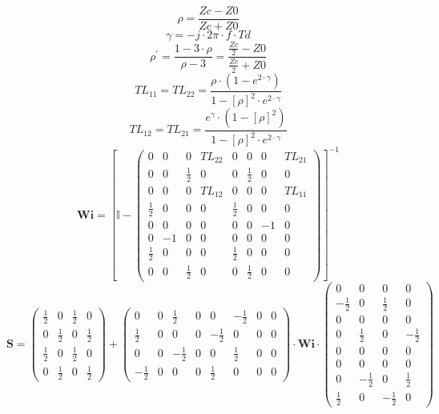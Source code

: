 \[ \rho =  \frac{ Zc-Z0 }{ Zc + Z0 } \]
\[ \gamma =  -j \cdot 2 \pi \cdot f \cdot Td \]
\[ \rho^\prime = \frac{1-3\cdot \rho }{\rho - 3} =  \frac{ \frac{ Zc
}{2} - Z0  }{ \frac{ Zc }{2} + Z0 } \]
\[ TL_{11}=TL_{22} =  \frac{ \rho \cdot \left( 1 - e^{2 \cdot \gamma }
\right) }{ 1 - \left[ \rho \right]^2 \cdot e^{2 \cdot \gamma }  } \]
\[ TL_{12}=TL_{21} =  \frac{ e^{\gamma} \cdot \left( 1 - \left[ \rho
\right] ^2 \right) }{ 1 - \left[ \rho \right]^2 \cdot e^{2 \cdot
\gamma }  }  \]
\[ \mathbf{Wi} =  \left[ \mathbb{I}  - \left(\begin{smallmatrix} 0 & 0
& 0 & TL_{22} & 0 & 0 & 0 & TL_{21} \\ 0 & 0 &  \frac{ 1 }{2}  & 0 & 0
&  \frac{ 1 }{ 2 }  & 0 & 0 \\ 0 & 0 & 0 & TL_{12} & 0 & 0 & 0 &
TL_{11} \\  \frac{ 1 }{ 2 }  & 0 & 0 & 0 &  \frac{ 1 }{2}  & 0 & 0 & 0
\\ 0 & 0 & 0 & 0 & 0 & 0 & -1 & 0 \\ 0 & -1 & 0 & 0 & 0 & 0 & 0 & 0 \\
\frac{ 1 }{2}  & 0 & 0 & 0 &  \frac{ 1 }{ 2 }  & 0 & 0 & 0 \\ 0 & 0 &
\frac{ 1 }{ 2 }  & 0 & 0 &  \frac{ 1 }{2}  & 0 & 0
\end{smallmatrix}\right) \right]^{-1}  \]
\[ \mathbf{S} = \left(\begin{smallmatrix}  \frac{ 1 }{2}  & 0 &
\frac{ 1 }{ 2 }  & 0 \\ 0 &  \frac{ 1 }{2}  & 0 &  \frac{ 1 }{ 2 }  \\
\frac{ 1 }{ 2 }  & 0 &  \frac{ 1 }{2}  & 0 \\ 0 &  \frac{ 1 }{ 2 }  &
0 &  \frac{ 1 }{2}  \end{smallmatrix}\right) +
\left(\begin{smallmatrix} 0 & 0 &  \frac{ 1 }{ 2 }  & 0 & 0 &  -\frac{
1 }{ 2 }  & 0 & 0 \\  \frac{ 1 }{ 2 }  & 0 & 0 & 0 &  -\frac{ 1 }{ 2 }
& 0 & 0 & 0 \\ 0 & 0 &  -\frac{ 1 }{ 2 }  & 0 & 0 &  \frac{ 1 }{ 2 }
& 0 & 0 \\  -\frac{ 1 }{ 2 }  & 0 & 0 & 0 &  \frac{ 1 }{ 2 }  & 0 & 0
& 0 \end{smallmatrix}\right) \cdot \mathbf{Wi}
\cdot\left(\begin{smallmatrix} 0 & 0 & 0 & 0 \\  -\frac{ 1 }{ 2 }  & 0
&  \frac{ 1 }{ 2 }  & 0 \\ 0 & 0 & 0 & 0 \\ 0 &  \frac{ 1 }{ 2 }  & 0
&  -\frac{ 1 }{ 2 }  \\ 0 & 0 & 0 & 0 \\ 0 & 0 & 0 & 0 \\ 0 &  -\frac{
1 }{ 2 }  & 0 &  \frac{ 1 }{ 2 }  \\  \frac{ 1 }{ 2 }  & 0 &  -\frac{
1 }{ 2 }  & 0 \end{smallmatrix}\right) \]
